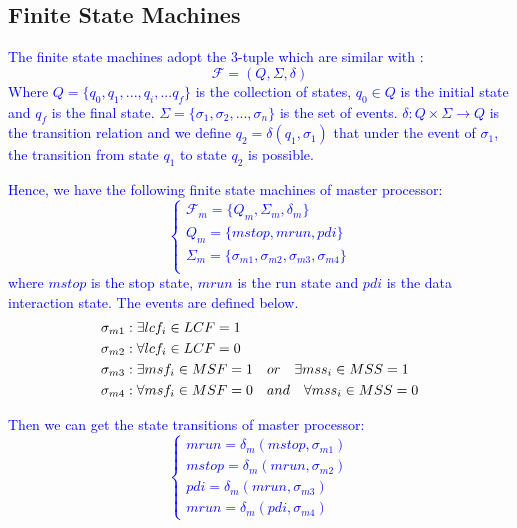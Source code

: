 \documentclass[journal,UTF8]{IEEEtran}
\begin{document}
 \subsection{Finite State Machines}
 \textcolor{blue}{ The finite state machines adopt the 3-tuple which are similar with \cite{G2007On}:
 \begin{equation}
 \mathcal{F} = (Q, \Sigma,\delta)
 \end{equation}
 Where $Q = \{q_0, q_1,..., q_i,...q_f\}$ is the collection of states, $q_0 \in Q$ is the initial state and $q_f$ is the final state. $\Sigma = \{\sigma_1, \sigma_2,..., \sigma_n\}$ is the set of events. $\delta: Q \times \Sigma \rightarrow Q$ is the transition relation and we define $q_2 = \delta(q_1, \sigma_1)$ that under the event of $\sigma_1$, the transition from state $q_1$ to state $q_2$ is possible.}
 
 \textcolor{blue}{Hence, we have the following finite state machines of master processor:
  \begin{equation}
 \left\{
 \begin{array}{l}
 \mathcal{F}_{m} = \{Q_m, \Sigma_m, \delta_m\}\\
 Q_m = \{mstop, mrun, pdi\}\\
 \Sigma_m = \{\sigma_{m1}, \sigma_{m2}, \sigma_{m3}, \sigma_{m4}\}\\
 \end{array}
 \right.
 \end{equation}
 where $mstop$ is the stop state, $mrun$ is the run state and $pdi$ is the data interaction state. The events are defined below.
 \begin{align}
 \notag\sigma_{m1}&: \exists lcf_i \in LCF = 1\\
\notag\sigma_{m2}&: \forall lcf_i \in LCF = 0\\
\notag\sigma_{m3}&: \exists msf_i \in MSF = 1\quad or \quad \exists mss_i \in MSS = 1\\
\notag\sigma_{m4}&: \forall msf_i \in MSF = 0\quad and \quad \forall mss_i \in MSS = 0
 \end{align}}

\textcolor{blue}{Then we can get the state transitions of master processor:
  \begin{equation}
 \left\{
 \begin{array}{l}
 mrun = \delta_m (mstop, \sigma_{m1})\\
mstop = \delta_m (mrun, \sigma_{m2})\\
pdi = \delta_m (mrun, \sigma_{m3})\\
mrun = \delta_m (pdi, \sigma_{m4})
 \end{array}
 \right.
 \end{equation}}
 
\end{document}
